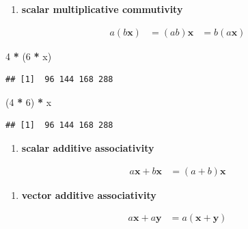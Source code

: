 \documentclass[
]{book}
\newenvironment{Shaded}{\begin{snugshade}}{\end{snugshade}}
\newcommand{\DecValTok}[1]{\textcolor[rgb]{0.00,0.00,0.81}{#1}}
\newcommand{\NormalTok}[1]{#1}
\newcommand{\OperatorTok}[1]{\textcolor[rgb]{0.81,0.36,0.00}{\textbf{#1}}}
\newcommand{\StringTok}[1]{\textcolor[rgb]{0.31,0.60,0.02}{#1}}
\providecommand{\tightlist}{%
  \setlength{\itemsep}{0pt}\setlength{\parskip}{0pt}}
\theoremstyle{definition}
\theoremstyle{definition}
\theoremstyle{definition}
\theoremstyle{definition}
\theoremstyle{remark}
\begin{document}
\begin{enumerate}
\def\labelenumi{\arabic{enumi})}
\setcounter{enumi}{1}
\tightlist
\item
  \textbf{scalar multiplicative commutivity}
\end{enumerate}

\[
\begin{aligned}
a (b \mathbf{x}) & = (ab) \mathbf{x} & = b (a \mathbf{x})
\end{aligned}
\]

\begin{Shaded}
\begin{Highlighting}[]
\DecValTok{4} \OperatorTok{*}\StringTok{ }\NormalTok{(}\DecValTok{6} \OperatorTok{*}\StringTok{ }\NormalTok{x) }
\end{Highlighting}
\end{Shaded}

\begin{verbatim}
## [1]  96 144 168 288
\end{verbatim}

\begin{Shaded}
\begin{Highlighting}[]
\NormalTok{(}\DecValTok{4} \OperatorTok{*}\StringTok{ }\DecValTok{6}\NormalTok{) }\OperatorTok{*}\StringTok{ }\NormalTok{x}
\end{Highlighting}
\end{Shaded}

\begin{verbatim}
## [1]  96 144 168 288
\end{verbatim}

\begin{enumerate}
\def\labelenumi{\arabic{enumi})}
\setcounter{enumi}{2}
\tightlist
\item
  \textbf{scalar additive associativity}
\end{enumerate}

\[
\begin{aligned}
a \mathbf{x} + b \mathbf{x} & = (a + b) \mathbf{x}
\end{aligned}
\]

\begin{enumerate}
\def\labelenumi{\arabic{enumi})}
\setcounter{enumi}{3}
\tightlist
\item
  \textbf{vector additive associativity}
\end{enumerate}

\[
\begin{aligned}
a \mathbf{x} + a \mathbf{y} & = a (\mathbf{x} + \mathbf{y})
\end{aligned}
\]
\end{document}
